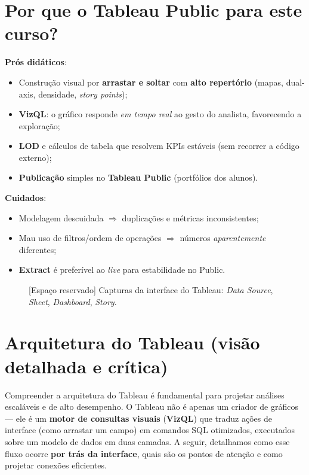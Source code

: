 \section{Por que o Tableau Public para este curso?}
\textbf{Prós didáticos}:
\begin{itemize}[leftmargin=*]
  \item Construção visual por \textbf{arrastar e soltar} com \textbf{alto repertório} (mapas, dual-axis, densidade, \textit{story points});
  \item \textbf{VizQL}: o gráfico responde \textit{em tempo real} ao gesto do analista, favorecendo a exploração;
  \item \textbf{LOD} e cálculos de tabela que resolvem KPIs estáveis (sem recorrer a código externo);
  \item \textbf{Publicação} simples no \textbf{Tableau Public} (portfólios dos alunos).
\end{itemize}
\textbf{Cuidados}:
\begin{itemize}[leftmargin=*]
  \item Modelagem descuidada \(\Rightarrow\) duplicações e métricas inconsistentes;
  \item Mau uso de filtros/ordem de operações \(\Rightarrow\) números \textit{aparentemente} diferentes;
  \item \textbf{Extract} é preferível ao \textit{live} para estabilidade no Public.
\end{itemize}

\begin{figure}[H]
\centering
\fbox{\rule{0pt}{120pt}\rule{0.92\linewidth}{0pt}}
\caption{[Espaço reservado] Capturas da interface do Tableau: \textit{Data Source}, \textit{Sheet}, \textit{Dashboard}, \textit{Story}.}
\end{figure}


\section{Arquitetura do Tableau (visão detalhada e crítica)}

Compreender a arquitetura do Tableau é fundamental para projetar análises escaláveis e de alto desempenho.  
O Tableau não é apenas um criador de gráficos — ele é um \textbf{motor de consultas visuais} (\textbf{VizQL}) que traduz ações de interface (como arrastar um campo) em comandos SQL otimizados, executados sobre um modelo de dados em duas camadas.  
A seguir, detalhamos como esse fluxo ocorre \textbf{por trás da interface}, quais são os pontos de atenção e como projetar conexões eficientes.


